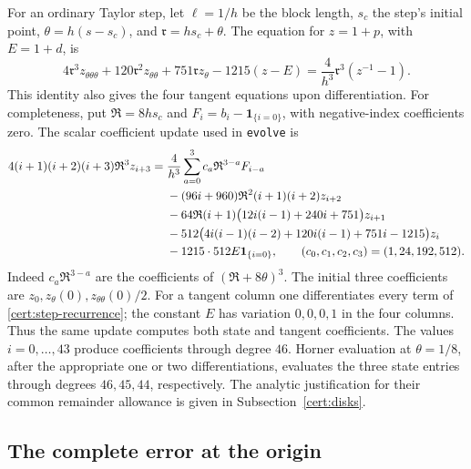 For an ordinary Taylor step, let \(\ell=1/h\) be the block length,
\(s_c\) the step's initial point, \(\theta=h(s-s_c)\), and
\(\mathfrak r=hs_c+\theta\).  The equation for \(z=1+p\), with
\(E=1+d\), is
\begin{equation}\label{cert:scaled-ode}
 4\mathfrak r^3 z_{\theta\theta\theta}
 +120\mathfrak r^2 z_{\theta\theta}
 +751\mathfrak r z_\theta-1215(z-E)
 =\frac{4}{h^3}\mathfrak r^3(z^{-1}-1).
\end{equation}
This identity also gives the four tangent equations upon differentiation.
For completeness, put \(\mathfrak R=8hs_c\) and
\(F_i=b_i-\mathbf1_{\{i=0\}}\), with negative-index coefficients zero.
The scalar coefficient update used in \texttt{evolve} is
\begin{align}
 4(i+1)(i+2)(i+3)\mathfrak R^3z_{i+3}
 ={}&\frac4{h^3}\sum_{a=0}^3
     c_a\mathfrak R^{3-a}F_{i-a}\notag\\
 &-(96i+960)\mathfrak R^2(i+1)(i+2)z_{i+2}\notag\\
 &-64\mathfrak R(i+1)
       \bigl(12i(i-1)+240i+751\bigr)z_{i+1}\notag\\
 &-512\bigl(4i(i-1)(i-2)+120i(i-1)+751i-1215\bigr)z_i\notag\\
 &-1215\cdot512E\mathbf1_{\{i=0\}},
 \qquad(c_0,c_1,c_2,c_3)=(1,24,192,512).
 \label{cert:step-recurrence}
\end{align}
Indeed \(c_a\mathfrak R^{3-a}\) are the coefficients of
\((\mathfrak R+8\theta)^3\).  The initial three coefficients are
\(z_0,z_\theta(0),z_{\theta\theta}(0)/2\).
For a tangent column one differentiates every term of
\eqref{cert:step-recurrence}; the constant \(E\) has variation \(0,0,0,1\)
in the four columns.  Thus the same update computes both state and tangent
coefficients.  The values \(i=0,\ldots,43\) produce coefficients through
degree \(46\).  Horner evaluation at \(\theta=1/8\), after the appropriate
one or two differentiations, evaluates the three state entries through
degrees \(46,45,44\), respectively.  The analytic justification for their
common remainder allowance is given in Subsection~\ref{cert:disks}.

\subsection{The complete error at the origin}\label{cert:origin-error}

